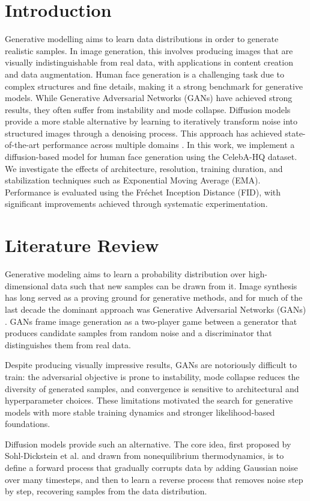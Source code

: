 \documentclass[conference]{IEEEtran}
\begin{document}
\section{Introduction}
Generative modelling aims to learn data distributions in order to generate realistic samples. In image generation, this involves producing images that are visually indistinguishable from real data, with applications in content creation and data augmentation.
Human face generation is a challenging task due to complex structures and fine details, making it a strong benchmark for generative models. While Generative Adversarial Networks (GANs) \cite{b1} have achieved strong results, they often suffer from instability and mode collapse.
Diffusion models provide a more stable alternative by learning to iteratively transform noise into structured images through a denoising process. This approach has achieved state-of-the-art performance across multiple domains \cite{b2}.
In this work, we implement a diffusion-based model for human face generation using the CelebA-HQ dataset. We investigate the effects of architecture, resolution, training duration, and stabilization techniques such as Exponential Moving Average (EMA). Performance is evaluated using the Fréchet Inception Distance (FID), with significant improvements achieved through systematic experimentation.

\section{Literature Review}
Generative modeling aims to learn a probability distribution over high-dimensional data such that new samples can be drawn from it. Image synthesis has long served as a proving ground for generative methods, and for much of the last decade the dominant approach was Generative Adversarial Networks (GANs) \cite{b1}. GANs frame image generation as a two-player game between a generator that produces candidate samples from random noise and a discriminator that distinguishes them from real data.

Despite producing visually impressive results, GANs are notoriously difficult to train: the adversarial objective is prone to instability, mode collapse reduces the diversity of generated samples, and convergence is sensitive to architectural and hyperparameter choices. These limitations motivated the search for generative models with more stable training dynamics and stronger likelihood-based foundations.

Diffusion models provide such an alternative. The core idea, first proposed by Sohl-Dickstein et al. \cite{b3} and drawn from nonequilibrium thermodynamics, is to define a forward process that gradually corrupts data by adding Gaussian noise over many timesteps, and then to learn a reverse process that removes noise step by step, recovering samples from the data distribution.
\end{document}
